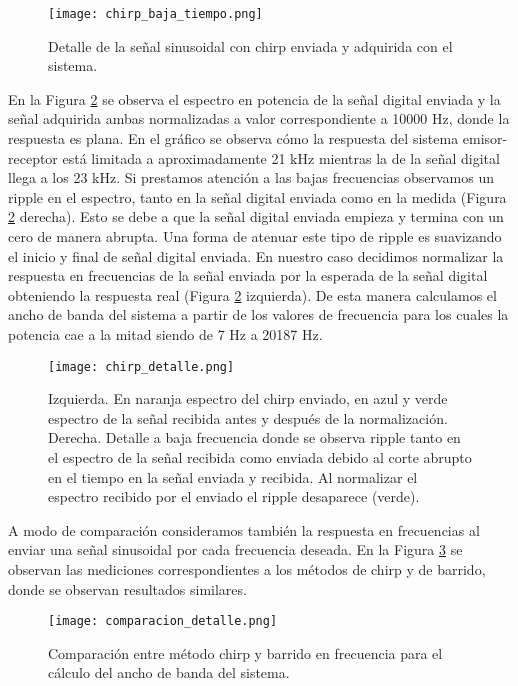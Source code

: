 \documentclass[a4paper, 11pt]{article}
\begin{document}
\begin{figure} [H]
\centering
\texttt{[image: chirp\_baja\_tiempo.png]}
\caption{Detalle de la señal sinusoidal con chirp enviada y adquirida con el sistema.\label{fig:chirp}}
\end{figure}
En la Figura \ref{fig:chirp_detalle} se observa el espectro en potencia de la señal digital enviada y la señal adquirida ambas normalizadas a valor correspondiente a 10000 Hz, donde la respuesta es plana. En el gráfico se observa cómo la respuesta del sistema emisor-receptor está limitada a aproximadamente 21 kHz mientras la de la señal digital llega a los 23 kHz. Si prestamos atención a las bajas frecuencias observamos un ripple en el espectro, tanto en la señal digital enviada como en la medida (Figura \ref{fig:chirp_detalle} derecha). Esto se debe a que la señal digital enviada empieza y termina con un cero de manera abrupta. Una forma de atenuar este tipo de ripple es suavizando el inicio y final de señal digital enviada. En nuestro caso decidimos normalizar la respuesta en frecuencias de la señal enviada por la esperada de la señal digital obteniendo la respuesta real (Figura \ref{fig:chirp_detalle} izquierda). De esta manera calculamos el ancho de banda del sistema a partir de los valores de frecuencia para los cuales la potencia cae a la mitad siendo de 7 Hz a 20187 Hz.

\begin{figure} [H]
\centering
\texttt{[image: chirp\_detalle.png]}
\caption{Izquierda. En naranja espectro del chirp enviado, en azul y verde espectro de la señal recibida antes y después de la normalización. Derecha. Detalle a baja frecuencia donde se observa ripple tanto en el espectro de la señal recibida como enviada debido al corte abrupto en el tiempo en la señal enviada y recibida. Al normalizar el espectro recibido por el enviado el ripple desaparece (verde).   \label{fig:chirp_detalle}}
\end{figure}

A modo de comparación consideramos también la respuesta en frecuencias al enviar una señal sinusoidal por cada frecuencia deseada. En la Figura \ref{fig:comparacionancho} se observan las mediciones correspondientes a los métodos de chirp y de barrido, donde se observan resultados similares. 

\begin{figure} [H]
\centering
\texttt{[image: comparacion\_detalle.png]}
\caption{Comparación entre método chirp y barrido en frecuencia para el cálculo del ancho de banda del sistema.\label{fig:comparacionancho}}
\end{figure} 
\end{document}
